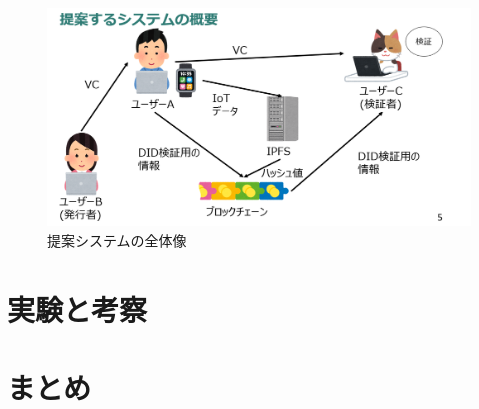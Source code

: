 \documentclass[a4paper,9pt,twocolumn]{ltjsarticle} %
\begin{document}
\begin{figure}[H]
  \centering
  \includegraphics[width=0.9\linewidth]{figure1.png}
  \caption{提案システムの全体像}
  \label{fig:system-overview}
\end{figure}

\section{実験と考察}

\section{まとめ}



\end{document}
